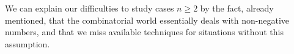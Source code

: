 \documentclass[11pt,reqno]{amsart}
\theoremstyle{plain}
\theoremstyle{definition}
\numberwithin{figure}{section}
\numberwithin{table}{section}
\numberwithin{equation}{section}
\begin{document}
We can explain our difficulties to study cases $n≥2$ by the fact, already mentioned, that the combinatorial world essentially deals with non-negative numbers, and that we miss available techniques for situations without this assumption.

















\newcommand{\etalchar}[1]{$^{#1}$}
\newcommand\andname{and}
\newcommand\Inname{In}
\newcommand\editionname{edition}
\newcommand\pagesname{pp.}
\providecommand{\bysame}{\leavevmode\hbox to3em{\hrulefill}\thinspace}
\end{document}
